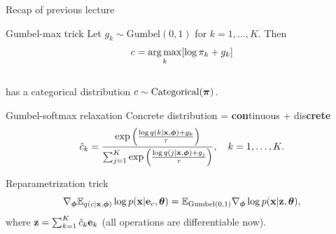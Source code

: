 \begin{frame}{Recap of previous lecture}
	\vspace{-0.4cm}
	\begin{block}{Gumbel-max trick}
		Let $g_k \sim \text{Gumbel}(0, 1)$ for $k = 1, \dots, K$. Then
		\vspace{-0.3cm}
		\[
			c = \operatorname*{arg\,max}_k [\log \pi_k + g_k]
		\]
		\vspace{-0.6cm} \\
		has a categorical distribution $c \sim \text{Categorical}(\boldsymbol{\pi})$.
	\end{block}
	\vspace{-0.2cm}
	\begin{block}{Gumbel-softmax relaxation}
		{\color{violet}Con}{\color{teal}crete} distribution = {\color{violet}\textbf{con}tinuous} + {\color{teal}dis\textbf{crete}}
		\vspace{-0.2cm}
		\[
			\hat{c}_k = \frac{\exp \left(\frac{\log q(k | \mathbf{x}, \boldsymbol{\phi}) + g_k}{\tau}\right)}{\sum_{j=1}^K \exp \left(\frac{\log q(j | \mathbf{x}, \boldsymbol{\phi}) + g_j}{\tau}\right)}, \quad k = 1, \dots, K.
		\]
		\vspace{-0.7cm}
 	\end{block}
	\begin{block}{Reparametrization trick}
		\vspace{-0.4cm}
		\[
			\nabla_{\boldsymbol{\phi}} \mathbb{E}_{q(c | \mathbf{x}, \boldsymbol{\phi})} \log p(\mathbf{x} | \mathbf{e}_{c} , \boldsymbol{\theta}) = \mathbb{E}_{\text{Gumbel}(0, 1)} \nabla_{\boldsymbol{\phi}} \log p(\mathbf{x} | \mathbf{z} , \boldsymbol{\theta}),
		\]
		where $\mathbf{z} = \sum_{k=1}^K\hat{c}_k \mathbf{e}_k$ (all operations are differentiable now).
	\end{block}
 	\vspace{-0.2cm}
\end{frame}
